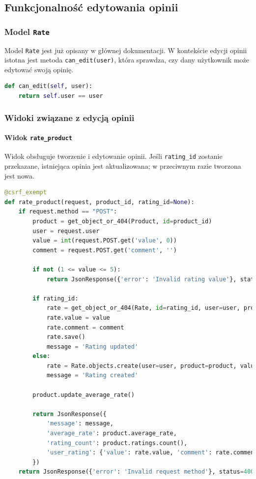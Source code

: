 \documentclass[12pt,a4paper,oneside]{article}
\theoremstyle{definition}
\numberwithin{equation}{section}
\begin{document}
% 
% 
\clearpage
\subsection{Funkcjonalność edytowania opinii}

\subsubsection{Model \texttt{Rate}}
Model \texttt{Rate} jest już opisany w głównej dokumentacji. W kontekście edycji opinii istotna jest metoda \texttt{can\_edit(user)}, która sprawdza, czy dany użytkownik może edytować swoją opinię.

\begin{lstlisting}[language=Python, caption=Metoda \texttt{can\_edit}]
def can_edit(self, user):
    return self.user == user
\end{lstlisting}



\subsubsection{Widoki związane z edycją opinii}

\paragraph{Widok \texttt{rate\_product}}
Widok obsługuje tworzenie i edytowanie opinii. Jeśli \texttt{rating\_id} zostanie przekazane, istniejąca opinia jest aktualizowana; w przeciwnym razie tworzona jest nowa.

\begin{lstlisting}[language=Python, caption=Widok \texttt{rate\_product}, label=rate_product_view]
@csrf_exempt
def rate_product(request, product_id, rating_id=None):
    if request.method == "POST":
        product = get_object_or_404(Product, id=product_id)
        user = request.user
        value = int(request.POST.get('value', 0))
        comment = request.POST.get('comment', '')

        if not (1 <= value <= 5):
            return JsonResponse({'error': 'Invalid rating value'}, status=400)

        if rating_id:
            rate = get_object_or_404(Rate, id=rating_id, user=user, product=product)
            rate.value = value
            rate.comment = comment
            rate.save()
            message = 'Rating updated'
        else:
            rate = Rate.objects.create(user=user, product=product, value=value, comment=comment)
            message = 'Rating created'

        product.update_average_rate()

        return JsonResponse({
            'message': message,
            'average_rate': product.average_rate,
            'rating_count': product.ratings.count(),
            'user_rating': {'value': rate.value, 'comment': rate.comment}
        })
    return JsonResponse({'error': 'Invalid request method'}, status=400)
\end{lstlisting}
\end{document}
